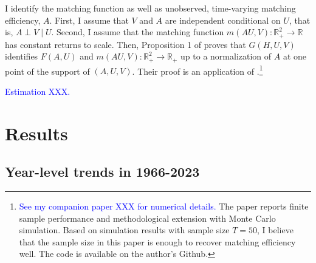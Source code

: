 \documentclass[12pt]{article}
\begin{document}
I identify the matching function as well as unobserved, time-varying matching efficiency, $A .$ 
First, I assume that $V$ and $A$ are independent conditional on $U$, that is, $A \perp V \mid U$. 
Second, I assume that the matching function $m(AU,V):\mathbb{R}_{+}^2 \rightarrow \mathbb{R}$ has constant returns to scale. 
Then, Proposition 1 of \cite{lange2020beyond} proves that $G(H, U, V)$ identifies $F(A, U)$ and $m(A U, V): \mathbb{R}_{+}^2 \rightarrow \mathbb{R}_{+}$ up to a normalization of $A$ at one point of the support of $(A, U, V)$. Their proof is an application of \cite{matzkin2003nonparametric}.\footnote{\textcolor{blue}{See my companion paper XXX for numerical details.} The paper reports finite sample performance and methodological extension with Monte Carlo simulation. Based on simulation results with sample size $T=50$, I believe that the sample size in this paper is enough to recover matching efficiency well. The code is available on the author's Github.}

\textcolor{blue}{Estimation XXX.}




\section{Results}

\subsection{Year-level trends in 1966-2023}
\end{document}
